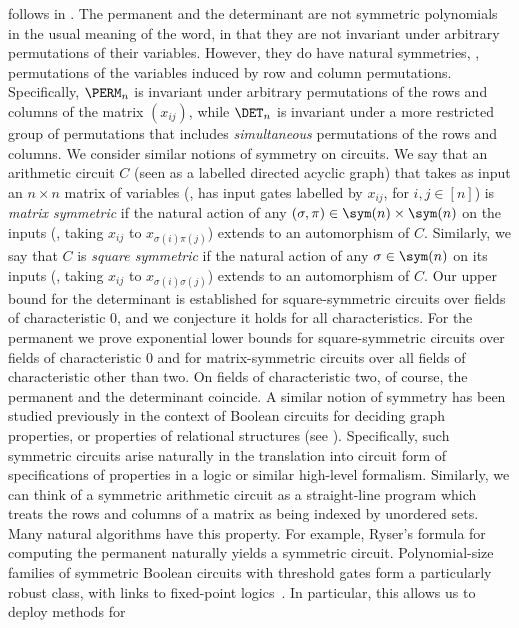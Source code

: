 \documentclass{toc}
\begin{document}
follows in .  The permanent and the determinant are
not symmetric polynomials in the usual meaning of the word, in that they are not
invariant under arbitrary permutations of their variables.  However, they do have
natural symmetries, \eg, permutations of the variables induced by row and column
permutations.  Specifically, $\PERM_n$ %
%
%
is invariant under arbitrary permutations
of the rows and columns of the matrix $(x_{ij})$, while $\DET_n$ is invariant
under a more restricted group of permutations that includes \emph{simultaneous}
permutations of the rows and columns.  We consider
similar notions of symmetry on circuits.  We say that an arithmetic circuit $C$
(seen as a labelled directed acyclic graph) that takes as input an $n \times n$
matrix of variables (\ie, has input gates labelled by $x_{ij}$, for $i, j \in
[n]$) is \emph{matrix symmetric} if the natural action of any $(\sigma,\pi) \in
\sym(n) \times\sym(n)$ on the inputs (\ie, taking $x_{ij}$ to
$x_{\sigma(i)\pi(j)}$) extends to an automorphism of $C$. Similarly, we say
that  %
$C$ is \emph{square symmetric} if the natural action of any $\sigma \in \sym(n)$ on
its inputs (\ie, taking $x_{ij}$ to $x_{\sigma(i)\sigma(j)}$) extends to an
automorphism of $C$.
Our upper bound for the determinant is established for
%
square-symmetric  %
%
circuits over fields of characteristic $0$, and we conjecture it holds for all characteristics. For the permanent we prove exponential lower bounds for square-symmetric circuits over fields of characteristic $0$ and for matrix-symmetric circuits over all fields of characteristic other than two.  On fields of characteristic two, of course, the permanent and the determinant coincide.
A similar notion of symmetry has been studied previously in the context of
Boolean circuits for deciding graph properties, or properties of relational
structures (see \cite{DenenbergGS86,Otto96,AndersonD17}). Specifically, such
symmetric circuits arise naturally in the translation into circuit form of
specifications of properties in a logic or similar high-level formalism.
Similarly, we can think of a symmetric arithmetic circuit as a straight-line
program which treats the rows and columns of a matrix as being indexed by
unordered sets. Many natural algorithms have this property. For example, Ryser's
formula for computing the permanent naturally yields a symmetric circuit.
Polynomial-size families of symmetric Boolean circuits with threshold gates form
a particularly robust class, with links to fixed-point
logics~\cite{AndersonD17}. In particular, this allows us to deploy methods for
\end{document}
